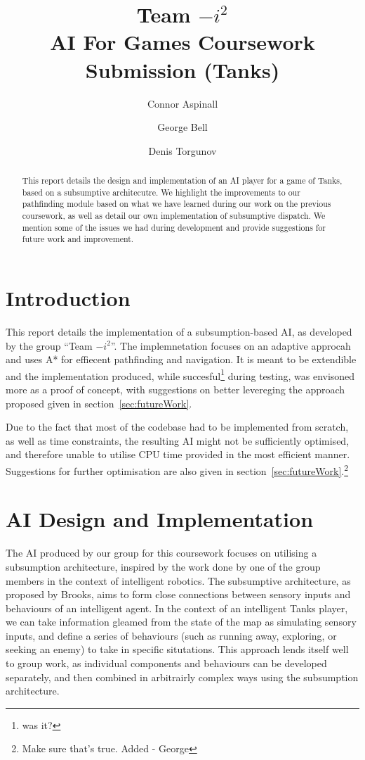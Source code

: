\documentclass[11pt]{article}
\title{Team \(-i^2\)\\
AI For Games Coursework Submission (Tanks)}
\author{Connor Aspinall \and George Bell \and Denis Torgunov}
\date{}
\begin{document}
\maketitle
\begin{abstract}
  This report details the design and implementation of an AI player for a game of Tanks, based on a subsumptive architecutre. We highlight the improvements to our pathfinding module based on what we have learned during our work on the previous coursework, as well as detail our own implementation of subsumptive dispatch. We mention some of the issues we had during development and provide suggestions for future work and improvement.
\end{abstract}
\tableofcontents
\thispagestyle{empty}

\newpage

\section{Introduction}
This report details the implementation of a subsumption-based AI, as developed by the group ``Team \(-i^2\)''. The implemnetation focuses on an adaptive approcah and uses A* for effiecent pathfinding and navigation. It is meant to be extendible and the implementation produced, while succesful\footnote{was it?} during testing, was envisoned more as a proof of concept, with suggestions on better levereging the approach proposed given in section~\ref{sec:futureWork}.

Due to the fact that most of the codebase had to be implemented from scratch, as well as time constraints, the resulting AI might not be sufficiently optimised, and therefore unable to utilise CPU time provided in the most efficient manner. Suggestions for further optimisation are also given in section~\ref{sec:futureWork}.\footnote{Make sure that's true. Added - George}

\section{AI Design and Implementation} \label{sec:design}

The AI produced by our group for this coursework focuses on utilising a subsumption architecture, inspired by the work done by one of the group members in the context of intelligent robotics. The subsumptive architecture, as proposed by Brooks, aims to form close connections between sensory inputs and behaviours of an intelligent agent\cite{brooks1}. In the context of an intelligent Tanks player, we can take information gleamed from the state of the map as simulating sensory inputs, and define a series of behaviours (such as running away, exploring, or seeking an enemy) to take in specific situtations. This approach lends itself well to group work, as individual components and behaviours can be developed separately, and then combined in arbitrairly complex ways using the subsumption architecture.
\end{document}

